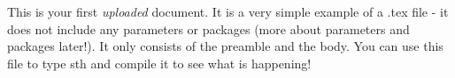 \documentclass{article}
\begin{document}
This is your first \emph{uploaded} document. It is a very simple example of a .tex file - it does not include any parameters or packages (more about parameters and packages later!). It only consists of the preamble and the body. You can use this file to type sth and compile it to see what is happening!
\end{document}

